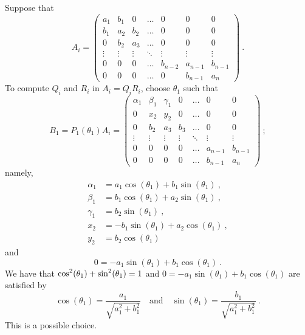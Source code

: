 Suppose that
\[
A_i =
\begin{pmatrix}
a_1 & b_1 & 0 & \ldots & 0 & 0 & 0 \\
b_1 & a_2 & b_2 & \ldots & 0 & 0 & 0 \\
0 & b_2 & a_3 & \ldots & 0 & 0 & 0 \\
\vdots & \vdots & \vdots & \ddots & \vdots & \vdots & \vdots \\
0 & 0 & 0 & \ldots & b_{n-2} & a_{n-1} & b_{n-1} \\
0 & 0 & 0 & \ldots & 0 & b_{n-1} & a_n
\end{pmatrix}
\ .
\]
To compute $Q_i$ and $R_i$ in $A_i = Q_iR_i$, choose $\theta_1$ such
that
\[
B_1 = P_1(\theta_1) A_i =
\begin{pmatrix}
\alpha_1 & \beta_1 & \gamma_1 & 0 & \ldots & 0 & 0 \\
0 & x_2 & y_2 & 0 & \ldots & 0 & 0 \\
0 & b_2 & a_3 & b_3 & \ldots & 0 & 0 \\
\vdots & \vdots & \vdots & \vdots & \ddots & \vdots & \vdots \\
0 & 0 & 0 & 0 & \ldots & a_{n-1} & b_{n-1} \\
0 & 0 & 0 & 0 & \ldots & b_{n-1} & a_n
\end{pmatrix} \ ;
\]
namely,
\begin{equation}\label{C14L34}
\begin{split}
\alpha_1 &= a_1 \cos(\theta_1) + b_1 \sin(\theta_1) \ , \\
\beta_1 &= b_1 \cos(\theta_1) + a_2 \sin(\theta_1) \ , \\
\gamma_1 &= b_2 \sin(\theta_1) \ , \\
x_2 &= - b_1 \sin(\theta_1) + a_2 \cos(\theta_1) \ , \\
y_2 & = b_2 \cos(\theta_1)
\end{split}
\end{equation}
and
\[
0 = -a_1 \sin(\theta_1) + b_1 \cos(\theta_1) \ .
\]
We have that $\displaystyle \cos^2(\theta_1)+\sin^2(\theta_1) = 1$ and
$0 = -a_1 \sin(\theta_1) + b_1 \cos(\theta_1)$ are satisfied by
\begin{equation} \label{C14L35}
\cos(\theta_1) = \frac{a_1}{\sqrt{a_1^2 + b_1^2}} \quad \text{and} \quad
\sin(\theta_1) = \frac{b_1}{\sqrt{a_1^2 + b_1^2}} \ .
\end{equation}
This is a possible choice.

